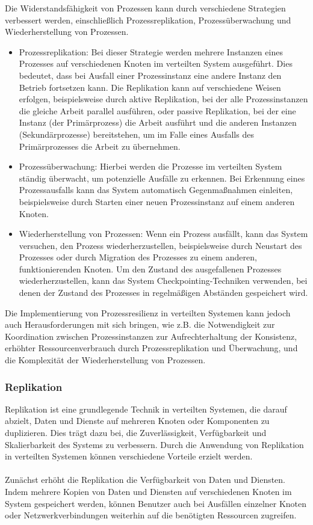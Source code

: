 Die Widerstandsfähigkeit von Prozessen kann durch verschiedene Strategien verbessert werden, einschließlich Prozessreplikation, Prozessüberwachung und Wiederherstellung von Prozessen.
\begin{itemize}
\item Prozessreplikation: Bei dieser Strategie werden mehrere Instanzen eines Prozesses auf verschiedenen Knoten im verteilten System ausgeführt. Dies bedeutet, dass bei Ausfall einer Prozessinstanz eine andere Instanz den Betrieb fortsetzen kann. Die Replikation kann auf verschiedene Weisen erfolgen, beispielsweise durch aktive Replikation, bei der alle Prozessinstanzen die gleiche Arbeit parallel ausführen, oder passive Replikation, bei der eine Instanz (der Primärprozess) die Arbeit ausführt und die anderen Instanzen (Sekundärprozesse) bereitstehen, um im Falle eines Ausfalls des Primärprozesses die Arbeit zu übernehmen.
\item Prozessüberwachung: Hierbei werden die Prozesse im verteilten System ständig überwacht, um potenzielle Ausfälle zu erkennen. Bei Erkennung eines Prozessausfalls kann das System automatisch Gegenmaßnahmen einleiten, beispielsweise durch Starten einer neuen Prozessinstanz auf einem anderen Knoten.
\item Wiederherstellung von Prozessen: Wenn ein Prozess ausfällt, kann das System versuchen, den Prozess wiederherzustellen, beispielsweise durch Neustart des Prozesses oder durch Migration des Prozesses zu einem anderen, funktionierenden Knoten. Um den Zustand des ausgefallenen Prozesses wiederherzustellen, kann das System Checkpointing-Techniken verwenden, bei denen der Zustand des Prozesses in regelmäßigen Abständen gespeichert wird.
\end{itemize}
Die Implementierung von Prozessresilienz in verteilten Systemen kann jedoch auch Herausforderungen mit sich bringen, wie z.B. die Notwendigkeit zur Koordination zwischen Prozessinstanzen zur Aufrechterhaltung der Konsistenz, erhöhter Ressourcenverbrauch durch Prozessreplikation und Überwachung, und die Komplexität der Wiederherstellung von Prozessen. 

\subsubsection{Replikation}

Replikation ist eine grundlegende Technik in verteilten Systemen, die darauf abzielt, Daten und Dienste auf mehreren Knoten oder Komponenten zu duplizieren. Dies trägt dazu bei, die Zuverlässigkeit, Verfügbarkeit und Skalierbarkeit des Systems zu verbessern. Durch die Anwendung von Replikation in verteilten Systemen können verschiedene Vorteile erzielt werden.
\\\\
Zunächst erhöht die Replikation die Verfügbarkeit von Daten und Diensten. Indem mehrere Kopien von Daten und Diensten auf verschiedenen Knoten im System gespeichert werden, können Benutzer auch bei Ausfällen einzelner Knoten oder Netzwerkverbindungen weiterhin auf die benötigten Ressourcen zugreifen.

